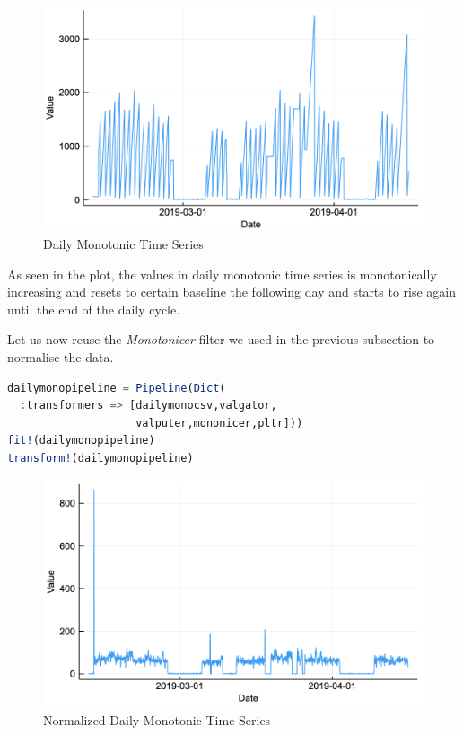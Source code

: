 \documentclass{juliacon}
\begin{document}
\begin{figure}[htbp]
   \centering
   \includegraphics[width=\columnwidth]{dailymono.png} %
   \caption{Daily Monotonic Time Series}
   \label{fig:dailymono}
\end{figure}

As seen in the plot, the values in daily monotonic time series is monotonically increasing and resets to certain baseline the following day and starts to rise again until the end of the daily cycle.

\vskip 6pt

Let us now reuse the \emph{Monotonicer} filter we used in the previous subsection to normalise the data.

\begin{lstlisting}[language = Julia]
dailymonopipeline = Pipeline(Dict(
  :transformers => [dailymonocsv,valgator,
                    valputer,mononicer,pltr]))
fit!(dailymonopipeline)
transform!(dailymonopipeline)
\end{lstlisting}

\begin{figure}[htbp]
   \centering
   \includegraphics[width=\columnwidth]{normdailymono.png}  %
   \caption{Normalized Daily Monotonic Time Series}
   \label{fig:ndailymono}
\end{figure}
\end{document}
